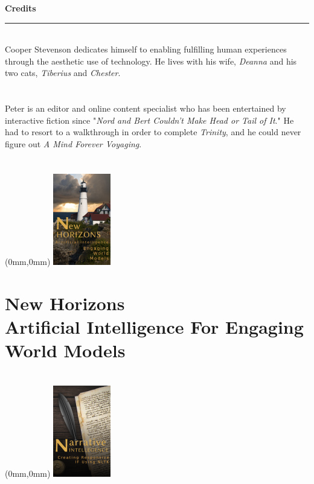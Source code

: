 \documentclass[11.75pt,openany,final]{memoir}
\begin{document}
  \BgThispage
  \tableofcontents*
  \noindent\LARGE{\textbf{Credits}}\medbreak
  \hrule
  \smallskip
  \noindent\large{}\\
  \noindent\small{Cooper Stevenson dedicates himself to enabling fulfilling
    human experiences through the aesthetic use of technology. He lives with his
    wife, \emph{Deanna} and his two cats, \emph{Tiberius} and \emph{Chester}.}\\ \\
  \noindent\large{}\\
  \noindent \small{Peter is an editor and online content
  specialist who has been entertained by interactive fiction since "\emph{Nord and
  Bert Couldn't Make Head or Tail of It}." He had to resort to a walkthrough in
  order to complete \emph{Trinity}, and he could never figure out \emph{A Mind Forever
    Voyaging}.}

\thispagestyle{empty} %
\newpage
\chapter*{}
\begin{textblock*}{70.9mm}(0mm,0mm)
\includegraphics[width=\paperwidth]{./media/images/editorial_cover}
\end{textblock*}
\clearpage
\chapter{New Horizons\\ \small{Artificial Intelligence For Engaging World Models}}


\chapter*{}
 \begin{textblock*}{70.9mm}(0mm,0mm)
   \includegraphics[width=\paperwidth]{./media/images/nltk_cover}
 \end{textblock*}
\end{document}
